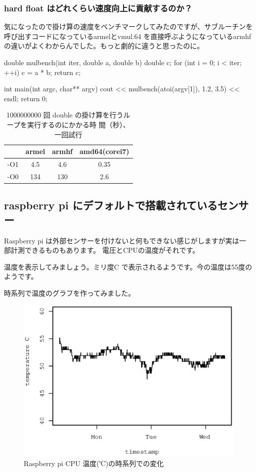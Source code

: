 \documentclass[mingoth,a4paper]{jsarticle}
\begin{document}
\subsubsection{hard float はどれくらい速度向上に貢献するのか？}

気になったので掛け算の速度をベンチマークしてみたのですが、サブルーチンを
呼び出すコードになっているarmelとvmul.64 を直接呼ぶようになっているarmhf
の違いがよくわからんでした。もっと劇的に違うと思ったのに。

\begin{commandline}
double mulbench(int iter, double a, double b) {
  double c;
  for (int i = 0; i < iter; ++i) {
    c = a * b;
  }
  return c;
}

int main(int argc, char** argv) {
  cout << mulbench(atoi(argv[1]), 1.2, 3.5) << endl;
  return 0;
}
\end{commandline}

\begin{table}
 \caption{1000000000 回 double の掛け算を行うループを実行するのにかかる時
 間（秒）、一回試行}
\begin{center}
 \begin{tabular}{|c|c|c|c|}
 \hline
 & armel & armhf & amd64(corei7) \\
 \hline
 -O1 & 4.5 & 4.6 &  0.35 \\
 -O0 & 134 & 130 &  2.6 \\
 \hline
 \end{tabular}
\end{center}
\end{table}

\subsection{raspberry pi にデフォルトで搭載されているセンサー}

Raspberry pi は外部センサーを付けないと何もできない感じがしますが実は一
部計測できるものもあります。
電圧とCPUの温度がそれです。

温度を表示してみましょう。ミリ度C で表示されるようです。今の温度は55度の
ようです。

時系列で温度のグラフを作ってみました。

\begin{figure}[H]
 \begin{center}
  \includegraphics[width=0.5\hsize]{image201307/temperature.eps}
  \caption{Raspberry pi CPU 温度(℃)の時系列での変化}
 \end{center}
\end{figure}
\end{document}
